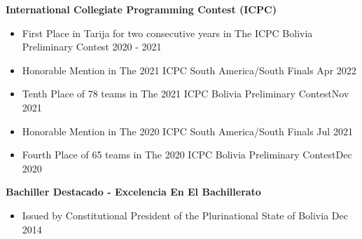 
{\textbf{International Collegiate Programming Contest (ICPC)}}\par
\begin{itemize}
    \item First Place in Tarija for two consecutive years in The ICPC Bolivia Preliminary Contest \hfill 2020 - 2021 
    \item Honorable Mention in The 2021 ICPC South America/South Finals \hfill Apr 2022 
	\item Tenth Place of 78 teams in The 2021 ICPC Bolivia Preliminary Contest\hfill Nov 2021 
	\item Honorable Mention in The 2020 ICPC South America/South Finals \hfill Jul 2021
	\item Fourth Place of 65 teams in The 2020 ICPC Bolivia Preliminary Contest\hfill Dec 2020 
\end{itemize}\vspace{0.1cm} \par

{\textbf{Bachiller Destacado - Excelencia En El Bachillerato}}\par
\begin{itemize}
    \item Issued by Constitutional President of the Plurinational State of Bolivia \hfill Dec 2014
\end{itemize}\vspace{0.1cm} \par